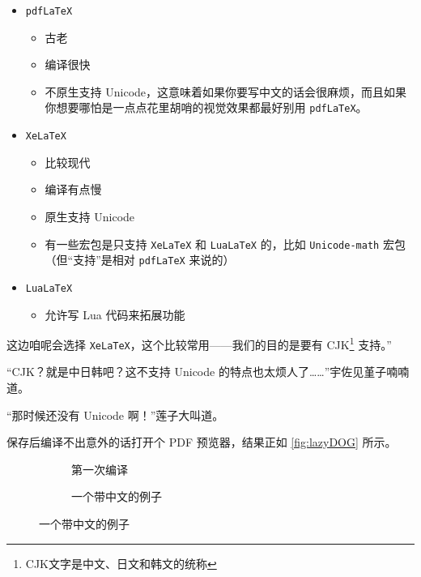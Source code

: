 \begin{itemize}
    \item \verb"pdfLaTeX"
          \begin{itemize}
              \item 古老
              \item 编译很快
              \item 不原生支持 Unicode，这意味着如果你要写中文的话会很麻烦，而且如果你想要哪怕是一点点花里胡哨的视觉效果都最好别用 \verb"pdfLaTeX"。
          \end{itemize}
    \item \verb"XeLaTeX"
          \begin{itemize}
              \item 比较现代
              \item 编译有点慢
              \item 原生支持 Unicode
              \item 有一些宏包是只支持 \verb"XeLaTeX" 和 \verb"LuaLaTeX" 的，比如 \verb"Unicode-math" 宏包（但“支持”是相对 \verb"pdfLaTeX" 来说的）
          \end{itemize}
    \item \verb"LuaLaTeX"
          \begin{itemize}
              \item 允许写 Lua 代码来拓展功能
          \end{itemize}
\end{itemize}

这边咱呢会选择 \verb`XeLaTeX`，这个比较常用——我们的目的是要有 CJK\footnote{CJK文字是中文、日文和韩文的统称} 支持。”

“CJK？就是中日韩吧？这不支持 Unicode 的特点也太烦人了……”宇佐见堇子喃喃道。

“那时候还没有 Unicode 啊！”莲子大叫道。

保存后编译不出意外的话打开个 PDF 预览器，结果正如 \autoref{fig:lazyDOG} 所示。

\begin{figure}[t]
    \centering
    \begin{subfigure}[t]{0.4\textwidth} \centering
        \caption{第一次编译}
        \label{fig:lazyDOG}
    \end{subfigure}\quad
    \begin{subfigure}[t]{0.4\textwidth} \centering
        \caption{一个带中文的例子}
        \label{fig:滚滚长江东逝水}
    \end{subfigure}
\end{figure}

